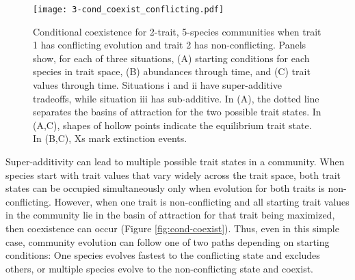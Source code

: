 \begin{figure}[ht!]
\centering
\texttt{[image: 3-cond\_coexist\_conflicting.pdf]}
\caption{Conditional coexistence for 2-trait, 5-species communities when trait 1 has 
    conflicting evolution and trait 2 has non-conflicting.
    Panels show, for each of three situations,
    (A) starting conditions for each species in trait space, 
    (B) abundances through time, and 
    (C) trait values through time.
    Situations i and ii have super-additive tradeoffs, while situation iii has 
    sub-additive.
    In (A), the dotted line separates the basins of attraction for the two possible
    trait states.
    In (A,C), shapes of hollow points indicate the equilibrium trait state.
    In (B,C), Xs mark extinction events.
}
\label{fig:conditional-coexistence}
\end{figure}










Super-additivity can lead to multiple possible trait states in a 
community.
When species start with trait values that vary widely 
across the trait space, both trait states can be occupied 
simultaneously only when evolution for both traits is non-conflicting.
However, when one trait is non-conflicting and all starting
trait values in the community lie in the basin of attraction
for that trait being maximized, then coexistence can occur
(Figure \ref{fig:cond-coexist}).
Thus, even in this simple case, community evolution can follow
one of two paths depending on starting conditions:
One species evolves fastest to the conflicting state and 
excludes others, or
multiple species evolve to the non-conflicting state
and coexist.

